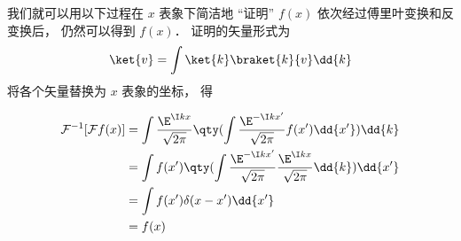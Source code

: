 我们就可以用以下过程在 $x$ 表象下简洁地 “证明” $f(x)$ 依次经过傅里叶变换和反变换后， 仍然可以得到 $f(x)$． 证明的矢量形式为
\begin{equation}
\ket{v} = \int \ket{k}\braket{k}{v} \dd{k}
\end{equation}
将各个矢量替换为 $x$ 表象的坐标， 得

\begin{equation}
\begin{aligned}
\mathcal F^{-1} [\mathcal F f(x)] &= \int \frac{\E^{\I k x}}{\sqrt{2\pi }} \qty(\int \frac{\E^{-\I k x'}}{\sqrt{2\pi }} f(x') \dd{x'}) \dd{k}\\
&= \int f(x') \qty(\int \frac{\E^{-\I k x'}}{\sqrt{2\pi }}\frac{\E^{\I k x}}{\sqrt{2\pi }}\dd{k}) \dd{x'}\\
&= \int f(x') \delta (x - x') \dd{x'}\\
&= f(x)
\end{aligned}
\end{equation}

